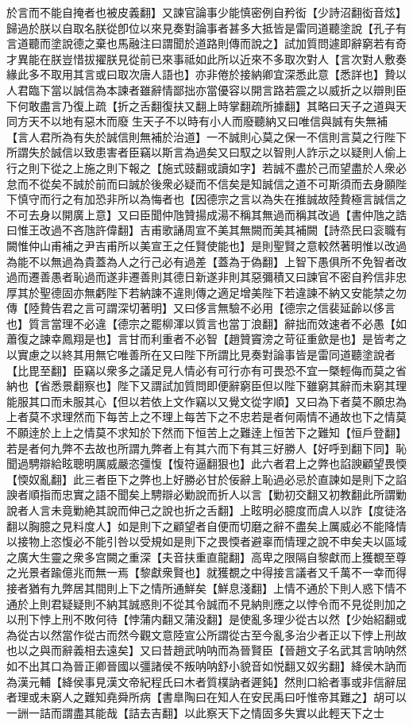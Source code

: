 於言而不能自掩者也被皮義翻】又諫官論事少能慎密例自矜衒【少詩沼翻衒音炫】歸過於朕以自取名朕從卽位以來見奏對論事者甚多大抵皆是雷同道聽塗說【孔子有言道聽而塗說德之棄也馬融注曰謂聞於道路則傳而說之】試加質問遽即辭窮若有奇才異能在朕豈惜拔擢朕見從前已來事祗如此所以近來不多取次對人【言次對人敷奏緣此多不取用其言或曰取次唐人語也】亦非倦於接納卿宜深悉此意【悉詳也】贄以人君臨下當以誠信為本諫者雖辭情鄙拙亦當優容以開言路若震之以威折之以辯則臣下何敢盡言乃復上疏【折之舌翻復扶又翻上時掌翻疏所據翻】其略曰天子之道與天同方天不以地有惡木而廢生天子不以時有小人而廢聽納又曰唯信與誠有失無補【言人君所為有失於誠信則無補於治道】一不誠則心莫之保一不信則言莫之行陛下所謂失於誠信以致患害者臣竊以斯言為過矣又曰馭之以智則人詐示之以疑則人偷上行之則下從之上施之則下報之【施式豉翻或讀如字】若誠不盡於己而望盡於人衆必怠而不從矣不誠於前而曰誠於後衆必疑而不信矣是知誠信之道不可斯須而去身願陛下慎守而行之有加恐非所以為悔者也【因德宗之言以為失在推誠故陸贄極言誠信之不可去身以開廣上意】又曰臣聞仲虺贊揚成湯不稱其無過而稱其改過【書仲虺之誥曰惟王改過不吝虺許偉翻】吉甫歌誦周宣不美其無闕而美其補闕【詩烝民曰衮職有闕惟仲山甫補之尹吉甫所以美宣王之任賢使能也】是則聖賢之意較然著明惟以改過為能不以無過為貴蓋為人之行己必有過差【蓋為于偽翻】上智下愚俱所不免智者改過而遷善愚者恥過而遂非遷善則其德日新遂非則其惡彌積又曰諫官不密自矜信非忠厚其於聖德固亦無虧陛下若納諫不違則傳之適足增美陛下若違諫不納又安能禁之勿傳【陸贄告君之言可謂深切著明】又曰侈言無驗不必用【德宗之信裴延齡以侈言也】質言當理不必違【德宗之罷柳渾以質言也當丁浪翻】辭拙而效速者不必愚【如蕭復之諫幸鳳翔是也】言甘而利重者不必智【趙贊竇滂之苛征重歛是也】是皆考之以實慮之以終其用無它唯善所在又曰陛下所謂比見奏對論事皆是雷同道聽塗說者【比毘至翻】臣竊以衆多之議足見人情必有可行亦有可畏恐不宜一槩輕侮而莫之省納也【省悉景翻察也】陛下又謂試加質問即便辭窮臣但以陛下雖窮其辭而未窮其理能服其口而未服其心【但以若依上文作竊以又覺文從字順】又曰為下者莫不願忠為上者莫不求理然而下每苦上之不理上每苦下之不忠若是者何兩情不通故也下之情莫不願逹於上上之情莫不求知於下然而下恒苦上之難逹上恒苦下之難知【恒戶登翻】若是者何九弊不去故也所謂九弊者上有其六而下有其三好勝人【好呼到翻下同】恥聞過騁辯給眩聰明厲威嚴恣彊愎【愎符逼翻狠也】此六者君上之弊也諂諛顧望畏愞【愞奴亂翻】此三者臣下之弊也上好勝必甘於佞辭上恥過必忌於直諫如是則下之諂諛者順指而忠實之語不聞矣上騁辯必勦說而折人以言【勦初交翻又初教翻此所謂勦說者人言未竟勦絶其說而伸己之說也折之舌翻】上眩明必臆度而虞人以詐【度徒洛翻以胸臆之見料度人】如是則下之顧望者自便而切磨之辭不盡矣上厲威必不能降情以接物上恣愎必不能引咎以受規如是則下之畏愞者避辜而情理之說不申矣夫以區域之廣大生靈之衆多宫闕之重深【夫音扶重直龍翻】高卑之限隔自黎獻而上獲覩至尊之光景者踰億兆而無一焉【黎獻衆賢也】就獲覩之中得接言議者又千萬不一幸而得接者猶有九弊居其間則上下之情所通鮮矣【鮮息淺翻】上情不通於下則人惑下情不通於上則君疑疑則不納其誠惑則不從其令誠而不見納則應之以悖令而不見從則加之以刑下悖上刑不敗何待【悖蒲内翻又蒲没翻】是使亂多理少從古以然【少始紹翻或為從古以然當作從古而然今觀文意陸宣公所謂從古至今亂多治少者正以下悖上刑故也以之與而辭義相去遠矣】又曰昔趙武呐呐而為晉賢臣【晉趙文子名武其言呐呐然如不出其口為晉正卿晉國以彊諸侯不叛呐呐舒小貌音如悦翻又奴劣翻】絳侯木訥而為漢元輔【絳侯事見漢文帝紀程氏曰木者質樸訥者遲鈍】然則口給者事或非信辭屈者理或未窮人之難知堯舜所病【書臯陶曰在知人在安民禹曰吁惟帝其難之】胡可以一詶一詰而謂盡其能哉【詰去吉翻】以此察天下之情固多失實以此輕天下之士